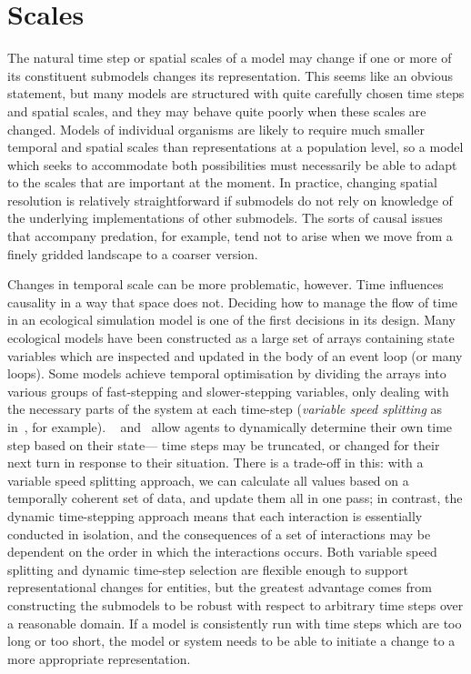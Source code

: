 \section{Scales}
The natural time step or spatial scales of a model may change if one
or more of its constituent submodels changes its representation.
This seems like an obvious statement, but many models are structured
with quite carefully chosen time steps and spatial scales, and they
may behave quite poorly when these scales are changed.  Models of
individual organisms are likely to require much smaller temporal and
spatial scales than representations at a population level, so a model
which seeks to accommodate both possibilities must necessarily be able
to adapt to the scales that are important at the moment.  In practice,
changing spatial resolution is relatively straightforward if submodels
do not rely on knowledge of the underlying implementations of other
submodels.  The sorts of causal issues that accompany predation, for
example, tend not to arise when we move from a finely gridded
landscape to a coarser version.

Changes in temporal scale can be more problematic, however. Time
influences causality in a way that space does not. Deciding how to
manage the flow of time in an ecological simulation model is one of
the first decisions in its design.  Many ecological models have been
constructed as a large set of arrays containing state variables which
are inspected and updated in the body of an event loop (or many
loops). Some models achieve temporal optimisation by dividing the
arrays into various groups of fast-stepping and slower-stepping
variables, only dealing with the necessary parts of the system at each
time-step (\emph{variable speed splitting} as
in~\cite{walters2000ecosystem}, for example). ~\cite{Gray06:1}
and~\cite{Gray2014} allow agents to dynamically determine their own
time step based on their state--- time steps may be truncated, or
changed for their next turn in response to their situation. There is a
trade-off in this: with a variable speed splitting approach, we can
calculate all values based on a temporally coherent set of data, and
update them all in one pass; in contrast, the dynamic time-stepping
approach means that each interaction is essentially conducted in
isolation, and the consequences of a set of interactions may be
dependent on the order in which the interactions occurs. Both variable
speed splitting and dynamic time-step selection are flexible enough to
support representational changes for entities, but the greatest
advantage comes from constructing the submodels to be robust with
respect to arbitrary time steps over a reasonable domain.  If a model
is consistently run with time steps which are too long or too short,
the model or system needs to be able to initiate a change to a more
appropriate representation.

